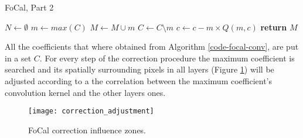 \begin{algorithm}[h]
  \caption{FoCal, Part 2}
  \label{code-focal-corr}
  \begin{algorithmic}
    \State $N \leftarrow \emptyset$ 
    \Repeat
    \State $m \leftarrow max(C)$
    \State $M \leftarrow M \cup m$
    \State $C \leftarrow C \setminus m$
     
     
    \State $c \leftarrow c - m \times Q(m, c)$
    \EndIf
    \EndFor
    \State \textbf{return} $M$
    \EndProcedure
  \end{algorithmic}
\end{algorithm}

All the coefficients that where obtained from Algorithm \ref{code-focal-conv}, are put in a set $C$. For every step of the correction procedure the maximum coefficient is searched and its spatially surrounding pixels in all layers (Figure \ref{fig:focal2}) will be adjusted according to a the correlation between the maximum coefficient's convolution kernel and the other layers ones.

\begin{figure}
  \label{fig:focal2}
  \texttt{[image: correction\_adjustment]}
  \caption{FoCal correction influence zones.}
\end{figure}




